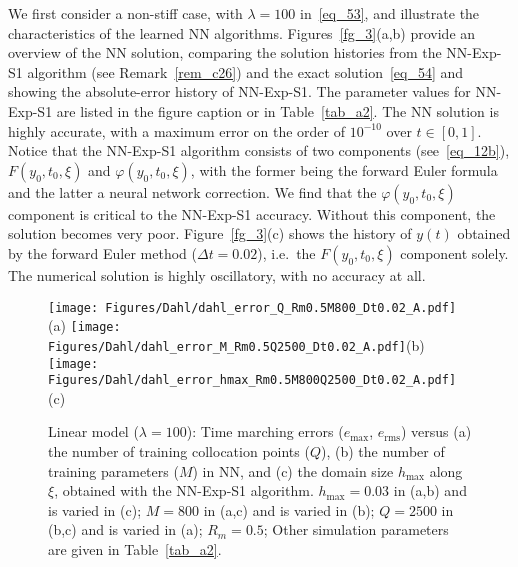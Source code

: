We first consider a non-stiff case, with $\lambda=100$ in~\eqref{eq_53}, and
illustrate the characteristics of the learned NN algorithms. 
Figures~\ref{fg_3}(a,b) provide an overview of the NN solution, comparing
the solution histories from the NN-Exp-S1 algorithm (see Remark~\ref{rem_c26})
and the exact solution~\eqref{eq_54} and showing the absolute-error history
of NN-Exp-S1. The parameter values for NN-Exp-S1 are listed in the figure caption
or in Table~\ref{tab_a2}.
The NN solution is highly accurate, with a maximum error on the order of $10^{-10}$
over $t\in[0,1]$.
Notice that the NN-Exp-S1 algorithm consists of two components (see~\eqref{eq_12b}),
$F(y_0,t_0,\xi)$ and $\varphi(y_0,t_0,\xi)$, with the former being the forward
Euler formula and the latter a neural network correction.
We find that the $\varphi(y_0,t_0,\xi)$ component is critical to
the NN-Exp-S1 accuracy. Without this component, the solution becomes very poor.
Figure~\ref{fg_3}(c) shows the history of $y(t)$ obtained by
the forward Euler method ($\Delta t=0.02$), i.e.~the $F(y_0,t_0,\xi)$ component
solely. The numerical solution is highly oscillatory, with no accuracy at all. 

\begin{figure}
  \centerline{
    \texttt{[image: Figures/Dahl/dahl\_error\_Q\_Rm0.5M800\_Dt0.02\_A.pdf]}(a)
    \texttt{[image: Figures/Dahl/dahl\_error\_M\_Rm0.5Q2500\_Dt0.02\_A.pdf]}(b)
    \texttt{[image: Figures/Dahl/dahl\_error\_hmax\_Rm0.5M800Q2500\_Dt0.02\_A.pdf]}(c)
  }
  \caption{Linear model ($\lambda=100$):
    Time marching errors ($e_{\max}$, $e_{\text{rms}}$) versus (a) the number of training
    collocation points ($Q$), (b) the number of training parameters ($M$)
    in NN, and (c) the domain size $h_{\max}$ along $\xi$, obtained
    with the NN-Exp-S1 algorithm.
    $h_{\max}=0.03$ in (a,b) and is varied in (c);
    $M=800$ in (a,c) and is varied in (b);
    $Q=2500$ in (b,c) and is varied in (a);
    $R_m=0.5$; Other simulation parameters are given in Table~\ref{tab_a2}.
  }
  \label{fg_4}
\end{figure}



